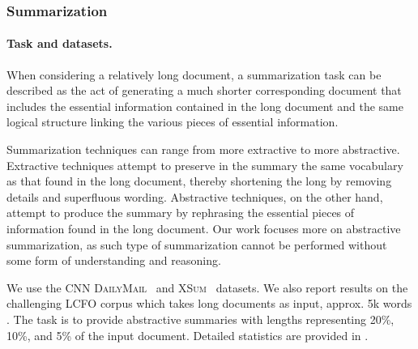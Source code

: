 \documentclass[twoside,11pt]{fairmeta}
\newcommand{\cnndm}{\textsc{CNN DailyMail}\xspace}
\newcommand{\xsum}{\textsc{XSum}\xspace}
\newcommand{\lcfo}{\textsc{LCFO}\xspace}
\begin{document}
\subsubsection{Summarization}
\label{sub:summ}

\paragraph{Task and datasets.}
When considering a relatively long document, a summarization task can be described as the act of generating a much shorter corresponding document that includes the essential information contained in the long document and the same logical structure linking the various pieces of essential information.

Summarization techniques can range from more extractive to more abstractive. Extractive techniques attempt to preserve in the summary the same vocabulary as that found in the long document, thereby shortening the long by removing details and superfluous wording. Abstractive techniques, on the other hand, attempt to produce the summary by rephrasing the essential pieces of information found in the long document. Our work focuses more on abstractive summarization, as such type of summarization cannot be performed without some form of understanding and reasoning.

We use the \cnndm~\citep{cnndm:neurip:2015} and \xsum~\citep{xsum:2018} datasets. %
We also report results on the challenging \lcfo corpus which takes long documents as input, approx. 5k words \citep{lcfo}. The task is to provide abstractive summaries with lengths representing 20\%, 10\%, and 5\% of the input document.
Detailed statistics are provided in .
\end{document}

